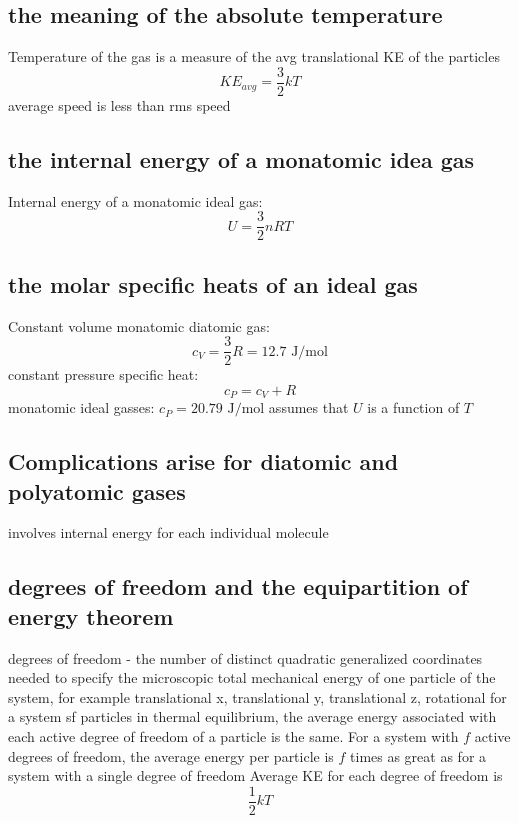 \documentclass{article}
\begin{document}
\subsection{the meaning of the absolute temperature}
\begin{outline}
\1 Temperature of the gas is a measure of the avg translational KE of the particles \[KE_{avg}=\dfrac{3}{2}kT\]
\1 average speed is less than rms speed
\end{outline}
\subsection{the internal energy of a monatomic idea gas}
\begin{outline}
\1 Internal energy of a monatomic ideal gas: \[U=\dfrac{3}{2}nRT\]
\end{outline}
\subsection{the molar specific heats of an ideal gas}
\begin{outline}
\1 Constant volume monatomic diatomic gas: \[c_V=\dfrac{3}{2}R=12.7\text{ J/mol}\]
\1 constant pressure specific heat: \[c_P=c_V+R\]
\2 monatomic ideal gasses: \(c_P=20.79\text{ J/mol}\)
\2 assumes that $U$ is a function of $T$
\end{outline}
\subsection{Complications arise for diatomic and polyatomic gases}
\begin{outline}
\1 involves internal energy for each individual molecule
\end{outline}
\subsection{degrees of freedom and the equipartition of energy theorem}
\begin{outline}
\1 degrees of freedom - the number of distinct quadratic generalized coordinates needed to specify the microscopic total mechanical energy of one particle of the system, for example translational x, translational y, translational z, rotational
\1 for a system sf particles in thermal equilibrium, the average energy associated with each active degree of freedom of a particle is the same. For a system with $f$ active degrees of freedom, the average energy per particle is $f$ times as great as for a system with a single degree of freedom
\1 Average KE for each degree of freedom is \[\dfrac{1}{2}kT\]
\end{outline}
\end{document}
